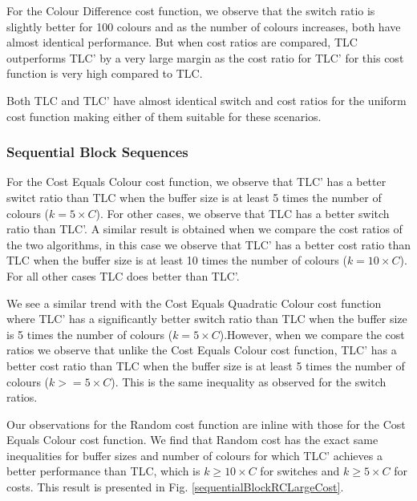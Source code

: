 For the Colour Difference cost function, we observe that the switch ratio is slightly better for 100 colours and as the number of colours increases, both have almost identical performance. But when cost ratios are compared, TLC outperforms TLC' by a very large margin as the cost ratio for TLC' for this cost function is very high compared to TLC. 

Both TLC and TLC' have almost identical switch and cost ratios for the uniform cost function making either of them suitable for these scenarios. 

\subsubsection{Sequential Block Sequences}

For the Cost Equals Colour cost function, we observe that TLC' has a better switct ratio than TLC when the buffer size is at least 5 times the number of colours ($ k = 5 \times C$). For other cases, we observe that TLC has a better switch ratio than TLC'. A similar result is obtained when we compare the cost ratios of the two algorithms, in this case we observe that TLC' has a better cost ratio than TLC when the buffer size is at least 10 times the number of colours ($k = 10 \times C$). For all other cases TLC does better than TLC'. 

We see a similar trend with the Cost Equals Quadratic Colour cost function where TLC' has a significantly better switch ratio than TLC when the buffer size is 5 times the number of colours ($k = 5 \times C$).However, when we compare the cost ratios we observe that unlike the Cost Equals Colour cost function, TLC' has a better cost ratio than TLC when the buffer size is at least 5 times the number of colours ($k >= 5 \times C$). This is the same inequality as observed for the switch ratios. 

Our observations for the Random cost function are inline with those for the Cost Equals Colour cost function. We find that Random cost has the exact same inequalities for buffer sizes and number of colours for which TLC' achieves a better performance than TLC, which is $k \geq 10 \times C$ for switches and $k \geq 5 \times C$ for costs. This result is presented in Fig. \ref{sequentialBlockRCLargeCost}.

